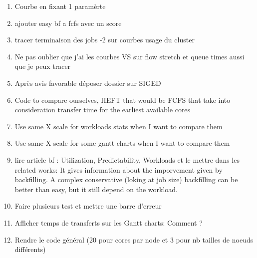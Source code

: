 \documentclass[a4paper]{article}
\begin{document}
\begin{enumerate}
			\item Courbe en fixant 1 paramèrte
			\item ajouter easy bf a fcfs avec un score						
			\item tracer terminaison des jobs -2 sur courbes usage du cluster
			\item Ne pas oublier que j'ai les courbes VS sur flow stretch et queue times aussi que je peux tracer						
			\item Après avis favorable déposer dossier sur SIGED
			\item Code to compare ourselves, HEFT that would be FCFS that take into consideration transfer time for the earliest available cores
			\item Use same X scale for workloads stats when I want to compare them
			\item Use same X scale for some gantt charts when I want to compare them
			\item lire article bf : Utilization, Predictability, Workloads et le mettre dans les related works: It gives information about the imporvement given by backfilling. A complex conservative (loking at job size) backfilling can be better than easy, but it still depend on the workload.
			\item Faire plusieurs test et mettre une barre d'erreur
			\item Afficher temps de transferts sur les Gantt charts: Comment ?
			\item Rendre le code général (20 pour cores par node et 3 pour nb tailles de noeuds différents)
		\end{enumerate}
		
\end{document}
